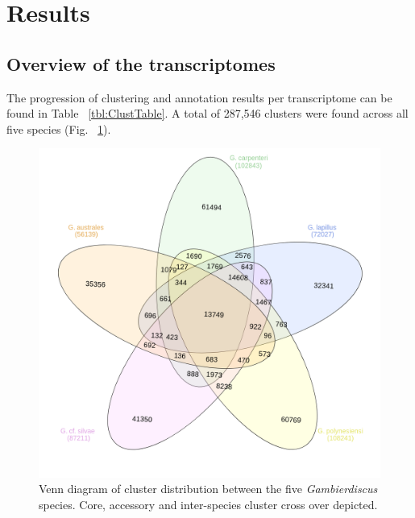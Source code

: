 \documentclass[12pt]{article}
\begin{document}
\newpage
\section{Results}
\FloatBarrier
\subsection{Overview of the transcriptomes}
The progression of clustering and annotation results per transcriptome can be found in Table ~\ref{tbl:ClustTable}. 
A total of 287,546 clusters were found across all five species (Fig. ~\ref{fig:SpeciesVenn}). 


\begin{figure} 
\includegraphics[scale=.4]{3Aug18_cluster-investigation/Species-venn.png} 
\caption{Venn diagram of cluster distribution between the five \textit{Gambierdiscus} species. Core, accessory and inter-species cluster cross over depicted.} 
\label{fig:SpeciesVenn}
\end{figure} 
\end{document}
